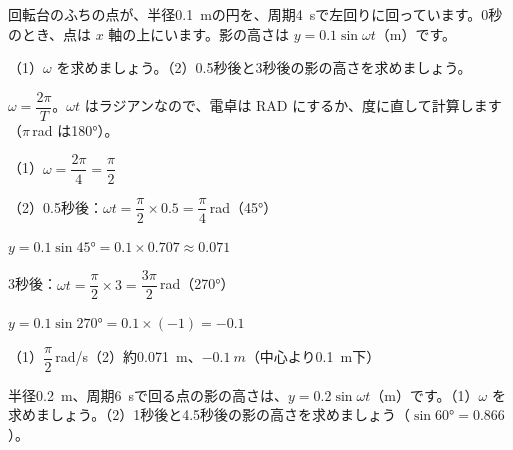 \begin{reidai}[回る点の影の高さ]
回転台のふちの点が、半径\qty{0.1}{m}の円を、周期\qty{4}{s}で左回りに回っています。0秒のとき、点は $x$ 軸の上にいます。影の高さは $y=0.1\sin\omega t$（m）です。\par
（1）$\omega$ を求めましょう。\quad（2）0.5秒後と3秒後の影の高さを求めましょう。\par
\kangaekata $\omega=\dfrac{2\pi}{T}$。$\omega t$ はラジアンなので、電卓は RAD にするか、度に直して計算します（$\pi$\,rad は180°）。\par
\shiki{}\zw{} （1）$\omega=\dfrac{2\pi}{4}=\dfrac{\pi}{2}$\par
\bkiviq （2）0.5秒後：$\omega t=\dfrac{\pi}{2}\times0.5=\dfrac{\pi}{4}$\,rad（45°）\par
\bkivib $y=0.1\sin45°=0.1\times0.707\approx0.071$\par
\bkivib 3秒後：$\omega t=\dfrac{\pi}{2}\times3=\dfrac{3\pi}{2}$\,rad（270°）\par
\bkivib $y=0.1\sin270°=0.1\times(-1)=-0.1$\par
\kotae{}\zw{} （1）$\dfrac{\pi}{2}$\,rad/s\quad（2）約\qty{0.071}{m}、$-\qty{0.1}{m}$（中心より\qty{0.1}{m}下）
\end{reidai}

\begin{jibun}
半径\qty{0.2}{m}、周期\qty{6}{s}で回る点の影の高さは、$y=0.2\sin\omega t$（m）です。（1）$\omega$ を求めましょう。（2）1秒後と4.5秒後の影の高さを求めましょう（$\sin60°=0.866$）。
\end{jibun}

